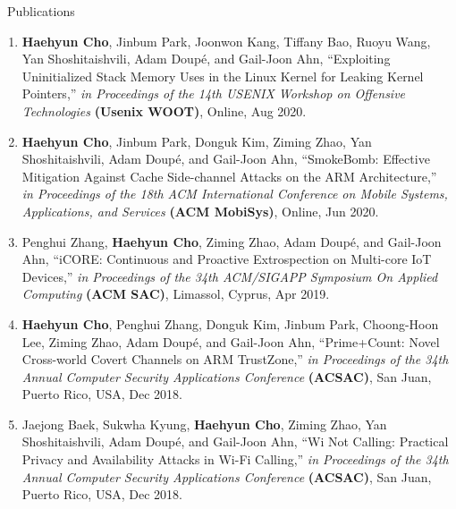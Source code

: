 \documentclass{resume} %
\begin{document}
\begin{rSection}{\faGenderless~Publications}
\begin{enumerate}[leftmargin=0pt]
        \item \textbf{Haehyun Cho}, Jinbum Park, Joonwon Kang, Tiffany Bao, Ruoyu Wang, Yan Shoshitaishvili, Adam Doup\'e, and Gail-Joon Ahn,
        ``Exploiting Uninitialized Stack Memory Uses in the Linux Kernel for Leaking Kernel Pointers,''
        \emph{in Proceedings of the 14th USENIX Workshop on Offensive Technologies} \textbf{(Usenix WOOT)},
        Online, Aug 2020.

        \item \textbf{Haehyun Cho}, Jinbum Park, Donguk Kim, Ziming Zhao, Yan Shoshitaishvili, Adam Doup\'e, and Gail-Joon Ahn,
		``SmokeBomb: Effective Mitigation Against Cache Side-channel Attacks on the ARM Architecture,'' 
        \emph{in Proceedings of the 18th ACM International Conference on Mobile Systems, Applications, and Services} \textbf{(ACM MobiSys)}, 
		Online, Jun 2020.

		\item Penghui Zhang, \textbf{Haehyun Cho}, Ziming Zhao, Adam Doup\'e, and Gail-Joon Ahn,
		``iCORE: Continuous and Proactive Extrospection on Multi-core IoT Devices,'' 
        \emph{in Proceedings of the 34th ACM/SIGAPP Symposium On Applied Computing} \textbf{(ACM SAC)}, 
		Limassol, Cyprus, Apr 2019.
     
        \item \textbf{Haehyun Cho}, Penghui Zhang, Donguk Kim, Jinbum Park, Choong-Hoon Lee, Ziming Zhao, Adam Doup\'e, and Gail-Joon Ahn,
		``Prime+Count: Novel Cross-world Covert Channels on ARM TrustZone,'' 
        \emph{in Proceedings of the 34th Annual Computer Security Applications Conference} \textbf{(ACSAC)}, 
		San Juan, Puerto Rico, USA, Dec 2018.

		\item Jaejong Baek, Sukwha Kyung, \textbf{Haehyun Cho}, Ziming Zhao, Yan Shoshitaishvili, Adam Doup\'e, and Gail-Joon Ahn,
		``Wi Not Calling: Practical Privacy and Availability Attacks in Wi-Fi Calling,'' 
        \emph{in Proceedings of the 34th Annual Computer Security Applications Conference} \textbf{(ACSAC)}, 
		San Juan, Puerto Rico, USA, Dec 2018.

	\end{enumerate}


\end{rSection}
\end{document}
